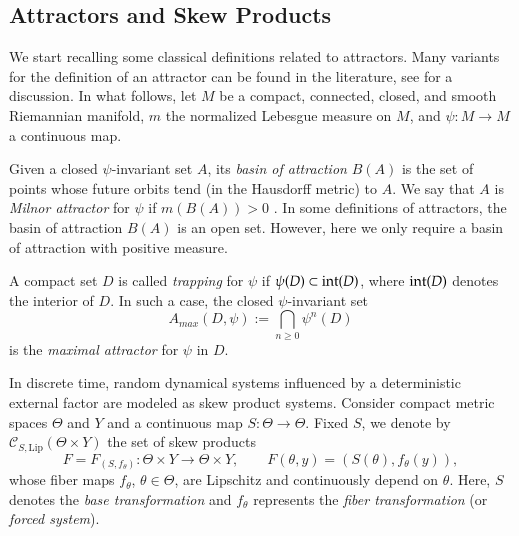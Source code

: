 \documentclass[11pt,reqno]{amsart}
\theoremstyle{plain}
\newtheorem*{theorem A}{Theorem A}
\newtheorem*{theorem B}{Theorem B}
\newtheorem*{theorem C}{Theorem C}
\newtheorem*{theorem 1}{Theorem 1}
\newtheorem*{theorem 2}{Theorem 2}
\newtheorem*{theorem 3}{Theorem 3}
\numberwithin{equation}{section}
\begin{document}





\subsection{Attractors and Skew Products}
We start recalling some classical definitions related to attractors.
Many variants for the definition of an attractor can be found in the literature,
see \cite{milnor1985concept} for a discussion.
In what follows, let  $M$  be a compact, connected, closed, and smooth Riemannian manifold,  $m$ the normalized Lebesgue measure on $M$, and
 $\psi \colon M \to M$ a continuous map.

 Given a closed $\psi$-invariant set $A$,  its \emph{basin of attraction} $B(A)$ is the set of points   whose future orbits tend  (in the Hausdorff metric) to $A$.
  We say that $A$ is  \emph{Milnor attractor} for $\psi$
if $m(B(A))>0$ \cite{milnor1985concept}.
In some definitions of attractors, the basin of attraction $B(A)$ is an open set. However, here we only
require a basin of attraction with positive measure.

A compact set $D$ is called \emph{trapping} for $\psi$ if $\psi(D) \subset \textnormal{int}(D)$, where $\textnormal{int}(D)$ denotes the interior of $D$. In such a case,  the
closed $\psi$-invariant set
\begin{equation}\label{e18}
A_{max}(D,\psi):= \bigcap_{n\geq 0}\psi^n(D)
\end{equation}
is  the \emph{maximal attractor} for $\psi$ in $D$.

In discrete time, random dynamical systems influenced by a deterministic external factor are modeled as skew product systems. 
 Consider compact metric spaces $\Theta$ and $Y$ and a continuous map
$S \colon \Theta \to \Theta$. Fixed $S$, we denote by $\mathcal{C}_{S, \mathrm{Lip}} (\Theta\times Y)$ the set of skew products
\begin{equation}
F=F_{(S,f_{\theta})} \colon \Theta \times Y \to \Theta \times Y, \qquad
F(\theta,y) =(S(\theta), f_\theta(y)),
\end{equation}
whose fiber maps $f_\theta$, $\theta \in \Theta$, are Lipschitz and continuously depend on $\theta$. Here, $S$ denotes the {\em{base transformation}} 
 and $f_\theta$ represents the {\em{fiber transformation}} (or {\em{forced system}}). 
\end{document}
